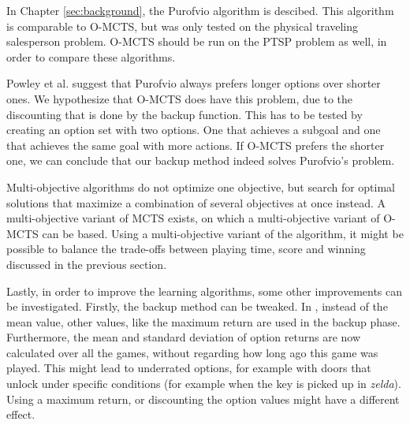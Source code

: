 In Chapter \ref{sec:background}, the Purofvio algorithm is descibed. This
algorithm is comparable to O-MCTS, but was only tested on the physical traveling
salesperson problem. O-MCTS should be run on the PTSP problem as well, in order
to compare these algorithms.

Powley et al. suggest that Purofvio always prefers longer options over shorter
ones. We hypothesize that O-MCTS does have this problem, due to the discounting
that is done by the backup function.  This has to be tested by creating an
option set with two options.  One that achieves a subgoal and one that achieves
the same goal with more actions. If O-MCTS prefers the shorter one, we can
conclude that our backup method indeed solves Purofvio's problem.

Multi-objective algorithms do not optimize one objective, but search for 
optimal solutions that maximize a combination of several objectives at once
instead. A multi-objective variant of MCTS exists, on which a multi-objective
variant of O-MCTS can be based. Using a multi-objective variant of the
algorithm, it might be possible to balance the trade-offs between playing time,
score and winning discussed in the previous section. 

Lastly, in order to improve the learning algorithms, some other improvements can be
investigated. Firstly, the backup method can be tweaked. In
\cite{coulom2007efficient}, instead of the mean value, other values, like the
maximum return are used in the backup phase. Furthermore, the mean and standard
deviation of option returns are now calculated over all the games, without
regarding how long ago this game was played. This might lead to underrated
options, for example with doors that unlock under specific conditions (for
example when the key is picked up in \textit{zelda}).  Using a maximum return,
or discounting the option values might have a different effect.

